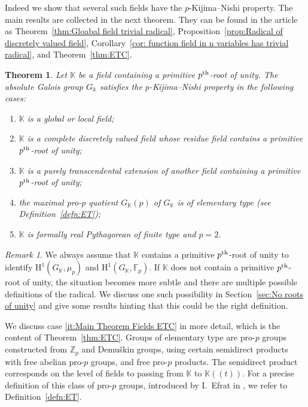 \documentclass{amsart}
\newtheorem{mainthm}{Theorem}
\theoremstyle{definition}
\theoremstyle{remark}
\newtheorem*{rem*}{Remark}
\newcommand{\KK}{\mathbb{K}}
\newcommand{\ZZ}{\mathbb{Z}}
\newcommand{\FF}{\mathbb{F}}
\newcommand{\rmH}{\mathrm H}%
\newcommand{\pth}{{p^{\rm th}}}
\begin{document}
Indeed we show that several such fields have the $p$-Kijima--Nishi property. The main results are collected in the next theorem. They can be found in the article as Theorem~\ref{thm:Gloabal field trivial radical}, Proposition~\ref{prop:Radical of discretely valued field}, Corollary~\ref{cor: function field in n variables has trivial radical}, and Theorem~\ref{thm:ETC}.
\begin{mainthm}
\label{mainthm:List of fields}
    Let $\KK$ be a field containing a primitive $\pth$-root of unity. The absolute Galois group $G_{\KK}$ satisfies the $p$-Kijima--Nishi property in the following cases:
    \begin{enumerate}[label=(\roman*)]
        \item  $\KK$ is a global or local field;
        \item  $\KK$ is a complete discretely valued field whose residue field contains a primitive $\pth$-root of unity;
        \item $\KK$ is a purely transcendental extension of another field containing a primitive $\pth$-root of unity;
        \item \label{it:Main Theorem Fields ETC} the maximal pro-$p$ quotient $G_\KK(p)$ of $G_{\KK}$ is of elementary type (see Definition~\ref{defn:ET});
        \item \label{it:Main Theorem Fields Pythagorean}$\KK$ is formally real Pythagorean of finite type and $p=2$.
    \end{enumerate}
\end{mainthm}
\begin{rem*}
    We always assume that $\KK$ contains a primitive $\pth$-root of unity to identify $\rmH^1(G_\KK,\mu_p)$ and $\rmH^1(G_\KK,\FF_p)$. If $\KK$ does not contain a primitive $\pth$-root of unity, the situation becomes more subtle and there are multiple possible definitions of the radical. We discuss one such possibility in Section~\ref{sec:No roots of unity} and give some results hinting that this could be the right definition.
\end{rem*}
We discuss case \ref{it:Main Theorem Fields ETC} in more detail, which is the content of Theorem~\ref{thm:ETC}. Groups of elementary type are pro-$p$ groups constructed from $\ZZ_p$ and Demu\v{s}kin groups, using certain semidirect products with free abelian pro-$p$ groups, and free pro-$p$ products. The semidirect product corresponds on the level of fields to passing from $\KK$ to $\KK(\!(t)\!)$. For a precise definition of this class of pro-$p$ groups, introduced by I.~Efrat in \cite{ETCsmall}, we refer to Definition~\ref{defn:ET}.
\end{document}
